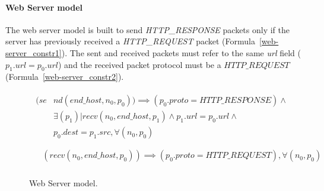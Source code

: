 \paragraph{Web Server model} The web server model is built to send \textit{HTTP\_RESPONSE} packets only if the server has previously received a \textit{HTTP\_REQUEST} packet (Formula~\ref{web-server_constr1}). The sent and received packets must refer to the same \textit{url} field (\textit{$p_{1}.url = p_{0}.url$}) and  the received packet protocol must be a $HTTP\_REQUEST$ (Formula~\ref{web-server_constr2}).
\begin{figure}[h]
	{\footnotesize
		\begin{subequations}
			\begin{align}
				\begin{split}
					\label{web-server_constr1}
					(se& nd(end\_host , n_{0}, p_{0})) \implies (p_{0}.proto = HTTP\_RESPONSE) \wedge \\
					& \exists (p_{1}) | recv(n_{0}, end\_host, p_{1}) \wedge p_{1}.url = p_{0}.url \wedge \\
					& p_{0}.dest = p_{1}.src, \forall (n_{0}, p_{0})\\
				\end{split} \\
				\begin{split}
					\label{web-server_constr2}
					& (recv( n_{0}, end\_host, p_{0})) \implies (p_{0}.proto = HTTP\_REQUEST), \forall (n_{0}, p_{0})\\					
				\end{split} 
			\end{align}
		\end{subequations}
	}%
	\caption{Web Server model.}
	\label{web-server_model}
\end{figure}


